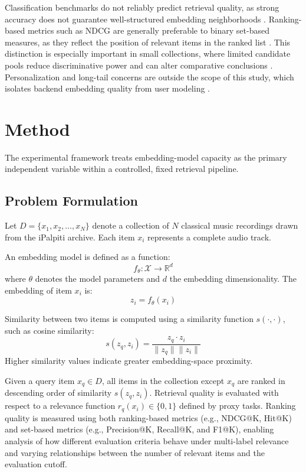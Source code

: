 \documentclass{article}
\begin{document}
Classification benchmarks do not reliably predict retrieval quality, as strong accuracy does not guarantee well-structured embedding neighborhoods \cite{tamm2024, gong2021ast, zaman2023}. Ranking-based metrics such as NDCG are generally preferable to binary set-based measures, as they reflect the position of relevant items in the ranked list \cite{urbano2013}. This distinction is especially important in small collections, where limited candidate pools reduce discriminative power and can alter comparative conclusions \cite{canamares2020}. Personalization and long-tail concerns \cite{lin2025, abbattista2024, schedl2021, porcaro2022} are outside the scope of this study, which isolates backend embedding quality from user modeling \cite{tamm2024, canamares2020}.

\section{Method}\label{sec:method}\label{ch:problem}\label{ch:methodology}

The experimental framework treats embedding-model capacity as the primary independent variable within a controlled, fixed retrieval pipeline.

\subsection{Problem Formulation}

Let $D = \{x_1, x_2, \dots, x_N\}$ denote a collection of $N$ classical music recordings drawn from
the iPalpiti archive. Each item $x_i$ represents a complete audio track.

An embedding model is defined as a function:
\[
f_\theta : \mathcal{X} \rightarrow \mathbb{R}^d
\]
where $\theta$ denotes the model parameters and $d$ the embedding dimensionality. The embedding of
item $x_i$ is:
\[
z_i = f_\theta(x_i)
\]

Similarity between two items is computed using a similarity function $s(\cdot,\cdot)$, such as cosine
similarity:
\[
s(z_q, z_i) = \frac{z_q \cdot z_i}{\|z_q\|\|z_i\|}
\]
Higher similarity values indicate greater embedding-space proximity.

Given a query item $x_q \in D$, all items in the collection except $x_q$ are ranked in descending
order of similarity $s(z_q, z_i)$. Retrieval quality is evaluated with respect to a relevance
function $r_q(x_i) \in \{0,1\}$ defined by proxy tasks. Ranking quality is measured using both
ranking-based metrics (e.g., NDCG@K, Hit@K) and set-based metrics (e.g., Precision@K, Recall@K,
and F1@K), enabling analysis of how different evaluation criteria behave under multi-label relevance
and varying relationships between the number of relevant items and the evaluation cutoff.
\end{document}
